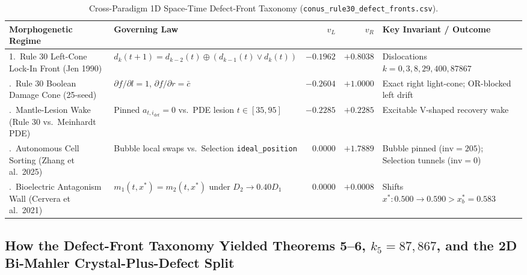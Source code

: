 \documentclass[11pt,a4paper]{article}
\theoremstyle{definition}
\theoremstyle{remark}
\begin{document}
\begin{table}[htbp]
\centering
\caption{Cross-Paradigm 1D Space-Time Defect-Front Taxonomy (\texttt{conus\_rule30\_defect\_fronts.csv}).}
\label{tab:defect_fronts}
\footnotesize
\begin{tabular}{@{}p{}p{}rrp{}@{}}
\toprule
\textbf{Morphogenetic Regime} & \textbf{Governing Law} & $v_L$ & $v_R$ & \textbf{Key Invariant / Outcome} \\
\midrule
1.\ Rule 30 Left-Cone Lock-In Front (Jen 1990) & $d_k(t+1) = d_{k-2}(t) \oplus (d_{k-1}(t) \lor d_k(t))$ & $-0.1962$ & $+0.8038$ & Dislocations $k=0,3,8,29,400,87867$ \\
\addlinespace
2.\ Rule 30 Boolean Damage Cone (25-seed) & $\partial f/\partial l = 1$, $\partial f/\partial r = \bar{c}$ & $-0.2604$ & $+1.0000$ & Exact right light-cone; OR-blocked left drift \\
\addlinespace
3.\ Mantle-Lesion Wake (Rule 30 vs.\ Meinhardt PDE) & Pinned $a_{t,i_{\mathrm{def}}}=0$ vs.\ PDE lesion $t\in[35,95]$ & $-0.2285$ & $+0.2285$ & Excitable V-shaped recovery wake \\
\addlinespace
4.\ Autonomous Cell Sorting (Zhang et al.\ 2025) & Bubble local swaps vs.\ Selection \texttt{ideal\_position} & $0.0000$ & $+1.7889$ & Bubble pinned ($\mathrm{inv}=205$); Selection tunnels ($\mathrm{inv}=0$) \\
\addlinespace
5.\ Bioelectric Antagonism Wall (Cervera et al.\ 2021) & $m_1(t,x^*) = m_2(t,x^*)$ under $D_2 \to 0.40 D_1$ & $0.0000$ & $+0.0008$ & Shifts $x^*: 0.500 \to 0.590 > x^*_b = 0.583$ \\
\bottomrule
\end{tabular}
\end{table}

\subsection{How the Defect-Front Taxonomy Yielded Theorems 5--6, $k_5 = 87{,}867$, and the 2D Bi-Mahler Crystal-Plus-Defect Split}
\end{document}
